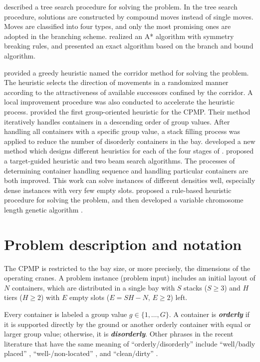 \documentclass[review,3p,times,12pt,number]{elsarticle}\usepackage{amsmath}\usepackage{amssymb}
\renewcommand{\citet}[1]{\citeauthor{#1} \citep{#1}}
\renewcommand{\emph}[1]{\textbf{\textit{#1}}}
\begin{document}
\citet{bort2012} described a tree search procedure for solving the problem.
In the tree search procedure, solutions are constructed by compound moves instead of single moves. Moves are classified into four types, and only the most promising ones are adopted in the branching scheme. \citet{tierney2014} realized an A* algorithm with symmetry breaking rules, and \citet{van2014} presented an exact algorithm based on the branch and bound algorithm.


\citet{cas2009} provided a greedy heuristic named the corridor method for solving the problem. The heuristic selects the direction of movements in a randomized manner according to the attractiveness of available successors confined by the corridor.
A local improvement procedure was also conducted to accelerate the heuristic process.
\citet{exp2012} provided the first group-oriented heuristic for the CPMP\@. Their method iteratively handles containers in a descending order of group values. After handling all containers with a specific group value, a stack filling process was applied to reduce the number of disorderly containers in the bay.
\citet{jovanovic2014} developed a new method which designs different heuristics for each of the four stages of \citet{exp2012}.
\citet{wang2015} proposed a target-guided heuristic and two beam search algorithms.
The processes of determining container handling sequence and handling particular containers are both improved.
This work can solve instances of different densities well, especially dense instances with very few empty slots.
\citet{Gheith2014} proposed a rule-based heuristic procedure for solving the problem, and then developed a variable chromosome length genetic algorithm \citep{Gheith2015}.


\section{Problem description and notation}
\label{sec:problem}

The CPMP is restricted to the bay size, or more precisely, the dimensions of the operating cranes. A problem instance (problem input) includes an initial layout of $N$ containers, which are distributed in a single bay with $S$ stacks ($S\ge 3$) and $H$ tiers ($H\ge 2$) with $E$ empty slots ($E=SH-N$, $E\ge 2$) left.

Every container is labeled a group value $g \in\{1,\dots,G\}$. A container is \emph{orderly} if it is supported directly by the ground or another orderly container with equal or larger group value; otherwise, it is \emph{disorderly}. Other phrases in the recent literature that have the same meaning of ``orderly{\slash}disorderly''  include ``well{\slash}badly placed'' \citep{bort2012}, ``well-{\slash}non-located'' \citep{exp2012}, and ``clean{\slash}dirty'' \citep{wang2015}.
\end{document}
